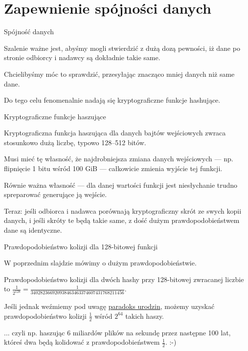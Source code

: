 \section{Zapewnienie spójności danych}

\begin{frame}{Spójność danych}
	
	Szalenie ważne jest, abyśmy mogli stwierdzić z dużą dozą pewności, iż dane po stronie odbiorcy i nadawcy są dokładnie takie same.
	
	Chcielibyśmy móc to sprawdzić, przesyłając znacząco mniej danych niż same dane.
	
	Do tego celu fenomenalnie nadają się kryptograficzne funkcje hashujące.

\end{frame}

\begin{frame}{Kryptograficzne funkcje haszujące}
	
	Kryptograficzna funkcja haszująca dla danych bajtów wejściowych zwraca stosunkowo dużą liczbę, typowo 128--512 bitów.
	
	Musi mieć tę własność, że najdrobniejsza zmiana danych wejściowych --- np. flipnięcie 1 bitu wśród 100 GiB --- całkowicie zmienia wyjście tej funkcji.
	
	Równie ważna własność --- dla danej wartości funkcji jest niesłychanie trudno spreparować generujące ją wejście.
	
	Teraz: jeśli odbiorca i nadawca porównają kryptograficzny skrót ze swych kopii danych, i jeśli skróty te będą takie same, z dość dużym prawdopodobieństwem dane są identyczne.
	
\end{frame}

\begin{frame}{Prawdopodobieństwo kolizji dla 128-bitowej funkcji}
	
	W poprzednim slajdzie mówimy o dużym prawdopodobieństwie.
	
	Prawdopodobieństwo kolizji dla dwóch hashy przy 128-bitowej zwracanej liczbie to $\frac{1}{2^{128}}=\frac{1}{340282366920938463463374607431768211456}$.
	
	Jeśli jednak weźmiemy pod uwagę \href{http://en.wikipedia.org/wiki/Birthday_problem}{paradoks urodzin}, możemy uzyskać prawdopodobieństwo kolizji $\frac{1}{2}$ wśród $2^{64}$ takich haszy.
	
	... czyli np. haszując 6 miliardów plików na sekundę przez następne 100 lat, któreś dwa będą kolidować z prawdopodobieństwem $\frac{1}{2}$. :-)
	
\end{frame}

